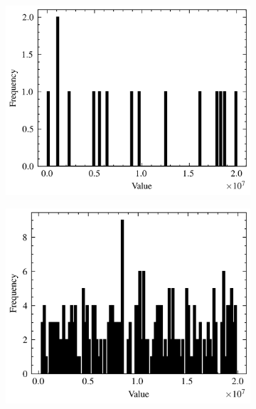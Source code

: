 \begin{figure}
	\centering
	\begin{subfigure}{0.48\linewidth}
		\centering
		\includegraphics[width=\linewidth]{src/figures/lcg-plot/rand/lcg-2-4.png}
	\end{subfigure}
	\begin{subfigure}{0.48\linewidth}
		\centering
		\includegraphics[width=\linewidth]{src/figures/lcg-plot/rand/lcg-2-8.png}
	\end{subfigure}
	\begin{subfigure}{0.48\linewidth}
		\centering

\end{subfigure}
\end{figure}
